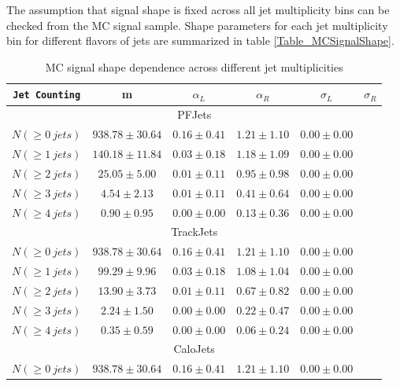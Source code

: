 \documentclass{cmspaper}
\begin{document}
The assumption that signal shape is fixed across all jet multiplicity bins can be checked from the MC signal sample.
Shape parameters for each jet multiplicity bin for different flavors of jets are summarized in table \ref{Table_MCSignalShape}.


\begin{table}[htdp]
   \caption{MC signal shape dependence across different jet multiplicities}
       \centering
       \begin{tabular}{|c|c|c|c|c|c|}
       \hline
       \verb|Jet Counting| & m & $\alpha_L$ & $\alpha_R$ & $\sigma_L$ & $\sigma_R$ \\
       \hline
       \multicolumn{6}{|c|}{PFJets} \\
       \hline
       $N(\geq 0~jets)$       & $ 938.78 \pm 30.64 $ & $ 0.16 \pm 0.41 $ & $ 1.21 \pm 1.10 $ & $ 0.00 \pm 0.00 $ \\
       $N(\geq 1~jets)$       & $ 140.18 \pm 11.84 $ & $ 0.03 \pm 0.18 $ & $ 1.18 \pm 1.09 $ & $ 0.00 \pm 0.00 $ \\
       $N(\geq 2~jets)$       & $ 25.05 \pm 5.00 $ & $ 0.01 \pm 0.11 $ & $ 0.95 \pm 0.98 $ & $ 0.00 \pm 0.00 $ \\
       $N(\geq 3~jets)$       & $ 4.54 \pm 2.13 $ & $ 0.01 \pm 0.11 $ & $ 0.41 \pm 0.64 $ & $ 0.00 \pm 0.00 $ \\
       $N(\geq 4~jets)$       & $ 0.90 \pm 0.95 $ & $ 0.00 \pm 0.00 $ & $ 0.13 \pm 0.36 $ & $ 0.00 \pm 0.00 $ \\
       \hline
       \multicolumn{6}{|c|}{TrackJets} \\
       \hline
       $N(\geq 0~jets)$       & $ 938.78 \pm 30.64 $ & $ 0.16 \pm 0.41 $ & $ 1.21 \pm 1.10 $ & $ 0.00 \pm 0.00 $ \\
       $N(\geq 1~jets)$       & $ 99.29 \pm 9.96 $ & $ 0.03 \pm 0.18 $ & $ 1.08 \pm 1.04 $ & $ 0.00 \pm 0.00 $ \\
       $N(\geq 2~jets)$       & $ 13.90 \pm 3.73 $ & $ 0.01 \pm 0.11 $ & $ 0.67 \pm 0.82 $ & $ 0.00 \pm 0.00 $ \\
       $N(\geq 3~jets)$       & $ 2.24 \pm 1.50 $ & $ 0.00 \pm 0.00 $ & $ 0.22 \pm 0.47 $ & $ 0.00 \pm 0.00 $ \\
       $N(\geq 4~jets)$       & $ 0.35 \pm 0.59 $ & $ 0.00 \pm 0.00 $ & $ 0.06 \pm 0.24 $ & $ 0.00 \pm 0.00 $ \\
       \hline
       \multicolumn{6}{|c|}{CaloJets} \\
       \hline
       $N(\geq 0~jets)$       & $ 938.78 \pm 30.64 $ & $ 0.16 \pm 0.41 $ & $ 1.21 \pm 1.10 $ & $ 0.00 \pm 0.00 $ \\

\end{tabular}
\end{table}
\end{document}
